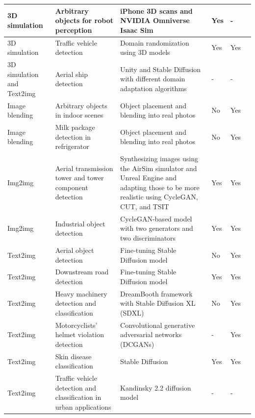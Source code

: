\begin{table}[h!]
\begin{threeparttable}
\begin{tabular}{P{1.75cm}|P{2.5cm}|P{2.5cm}|P{1.85cm}|P{2.25cm}|P{1.25cm}}
    3D simulation & Arbitrary objects for robot perception & iPhone 3D scans and NVIDIA Omniverse Isaac Sim & Yes & - & \cite{singh2024syntheticalargescalesynthetic} \\ \hline
    3D simulation & Traffic vehicle detection & Domain randomization using 3D models & Yes & Yes & \cite{tremblay2018trainingdeepnetworkssynthetic} \\ \hline
    3D simulation and Text2img & Aerial ship detection & Unity and Stable Diffusion with different domain adaptation algorithms & - & - & \cite{app14114558} \\ \hline
    Image blending & Arbitrary objects in indoor scenes & Object placement and blending into real photos & No & Yes & \cite{georgakis2017synthesizingtrainingdataobject} \\ \hline
    Image blending & Milk package detection in refrigerator & Object placement and blending into real photos & No & Yes & \cite{Bartolovic2024FromST} \\ \hline
    Img2img & Aerial transmission tower and tower component detection & Synthesizing images using the AirSim simulator and Unreal Engine and adapting those to be more realistic using CycleGAN, CUT, and TSIT & Yes & Yes & \cite{Peterlevitz2023SimtoRealTF} \\ \hline
    Img2img & Industrial object detection & CycleGAN-based model with two generators and two discriminators & Yes & Yes & \cite{math11224588} \\ \hline
    Text2img & Aerial object detection & Fine-tuning Stable Diffusion model & No & Yes & \cite{jian2023stablediffusionaerialobject} \\ \hline
    Text2img & Downstream road detection & Fine-tuning Stable Diffusion model & Yes & Yes & \cite{tang2024crsdiffcontrollableremotesensing} \\ \hline
    Text2img & Heavy machinery detection and classification & DreamBooth framework with Stable Diffusion XL (SDXL) & No & Yes & \cite{xin2024dartautomatedendtoendobject} \\ \hline
    Text2img & Motorcyclists' helmet violation detection & Convolutional generative adversarial networks (DCGANs) & - & Yes & \cite{a17050202} \\ \hline
    Text2img & Skin disease classification & Stable Diffusion & Yes & Yes & \cite{akrout2023diffusionbaseddataaugmentationskin} \\ \hline
    Text2img & Traffic vehicle detection and classification in urban applications & Kandinsky 2.2 diffusion model & - & - & \cite{REUTOV2023335} \\ \hline

\end{tabular}
\end{threeparttable}
\end{table}
